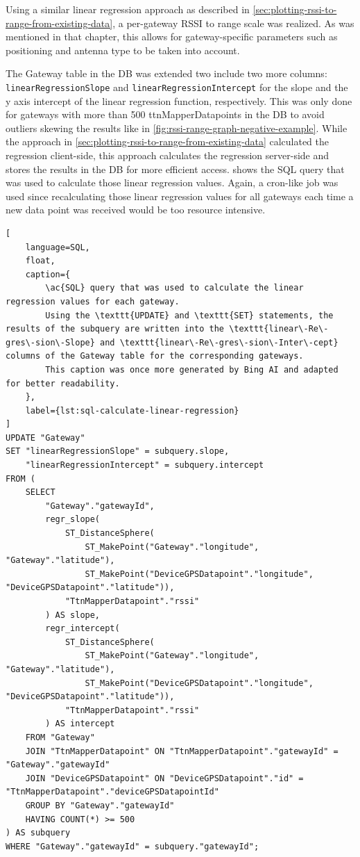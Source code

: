 Using a similar linear regression approach as described in \cref{sec:plotting-rssi-to-range-from-existing-data}, a per-gateway \ac{RSSI} to range scale was realized.
As was mentioned in that chapter, this allows for gateway-specific parameters such as positioning and antenna type to be taken into account.

The Gateway table in the \ac{DB} was extended two include two more columns: \texttt{linear\-Regres\-sion\-Slope} and \texttt{linear\-Re\-gres\-sion\-Inter\-cept} for the slope and the y axis intercept of the linear regression function, respectively.
This was only done for gateways with more than 500 ttnMapperDatapoints in the \ac{DB} to avoid outliers skewing the results like in \cref{fig:rssi-range-graph-negative-example}.
While the approach in \cref{sec:plotting-rssi-to-range-from-existing-data} calculated the regression client-side, this approach calculates the regression server-side and stores the results in the \ac{DB} for more efficient access.
 shows the \ac{SQL} query that was used to calculate those linear regression values.
Again, a cron-like job was used since recalculating those linear regression values for all gateways each time a new data point was received would be too resource intensive.

\begin{lstlisting}[
    language=SQL,
    float,
    caption={
        \ac{SQL} query that was used to calculate the linear regression values for each gateway.
        Using the \texttt{UPDATE} and \texttt{SET} statements, the results of the subquery are written into the \texttt{linear\-Re\-gres\-sion\-Slope} and \texttt{linear\-Re\-gres\-sion\-Inter\-cept} columns of the Gateway table for the corresponding gateways.
        This caption was once more generated by Bing AI and adapted for better readability.
    },
    label={lst:sql-calculate-linear-regression}
]
UPDATE "Gateway"
SET "linearRegressionSlope" = subquery.slope,
    "linearRegressionIntercept" = subquery.intercept
FROM (
    SELECT
        "Gateway"."gatewayId",
        regr_slope(
            ST_DistanceSphere(
                ST_MakePoint("Gateway"."longitude", "Gateway"."latitude"),
                ST_MakePoint("DeviceGPSDatapoint"."longitude", "DeviceGPSDatapoint"."latitude")),
            "TtnMapperDatapoint"."rssi"
        ) AS slope,
        regr_intercept(
            ST_DistanceSphere(
                ST_MakePoint("Gateway"."longitude", "Gateway"."latitude"),
                ST_MakePoint("DeviceGPSDatapoint"."longitude", "DeviceGPSDatapoint"."latitude")),
            "TtnMapperDatapoint"."rssi"
        ) AS intercept
    FROM "Gateway"
    JOIN "TtnMapperDatapoint" ON "TtnMapperDatapoint"."gatewayId" = "Gateway"."gatewayId"
    JOIN "DeviceGPSDatapoint" ON "DeviceGPSDatapoint"."id" = "TtnMapperDatapoint"."deviceGPSDatapointId"
    GROUP BY "Gateway"."gatewayId"
    HAVING COUNT(*) >= 500
) AS subquery
WHERE "Gateway"."gatewayId" = subquery."gatewayId";
\end{lstlisting}

